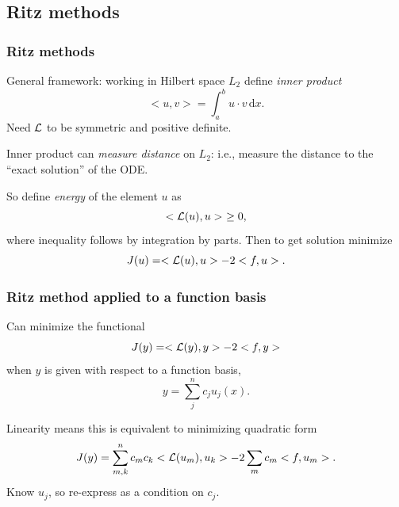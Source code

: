 \documentclass{beamer}
\begin{document}
\subsection{Ritz methods}

\begin{frame}
  \frametitle{Ritz methods}

  General framework: working in Hilbert space $L_2$ define \emph{inner
    product}
  \begin{equation*}
    < u, v > = \int_a^b u \cdot v \, \text{d} x.
  \end{equation*} \pause
  Need ${\cal L}$ to be symmetric and positive definite.

  \vspace{1ex}

  Inner product can \emph{measure distance} on $L_2$: i.e., measure
  the distance to the ``exact solution'' of the ODE. \pause

  \vspace{1ex}

  So define \emph{energy} of the element $u$ as
  \begin{equation*}
    < {\cal L}(u), u > \,\, \ge 0,
  \end{equation*}
  where inequality follows by integration by parts. \pause Then to get
  solution minimize
  \begin{equation*}
    J(u) = < {\cal L}(u), u > - 2 < f, u >.
  \end{equation*}

\end{frame}

\begin{frame}
  \frametitle{Ritz method applied to a function basis}

  Can minimize the functional
  \begin{equation*}
    J(y) = < {\cal L}(y), y > - 2 < f, y >
  \end{equation*}
  when $y$ is given with respect to a function basis,
  \begin{equation*}
    y = \sum_j^n c_j u_j(x).
  \end{equation*} \pause

  Linearity means this is equivalent to minimizing quadratic form
  \begin{equation*}
    J(y) = \sum_{m,k}^n c_m c_k < {\cal L}(u_m), u_k > - 2 \sum_m c_m
    < f, u_m >.
  \end{equation*} \pause
  Know $u_j$, so re-express as a condition on $c_j$.

\end{frame}
\end{document}
